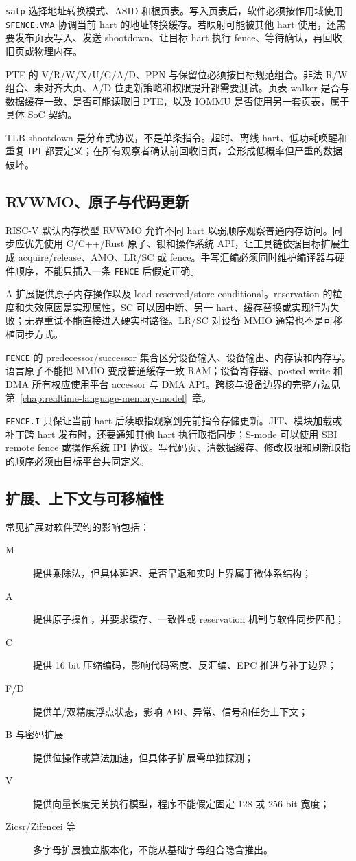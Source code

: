 \texttt{satp} 选择地址转换模式、ASID 和根页表。写入页表后，软件必须按作用域使用 \texttt{SFENCE.VMA} 协调当前 hart 的地址转换缓存。若映射可能被其他 hart 使用，还需要发布页表写入、发送 shootdown、让目标 hart 执行 fence、等待确认，再回收旧页或物理内存。

PTE 的 V/R/W/X/U/G/A/D、PPN 与保留位必须按目标规范组合。非法 R/W 组合、未对齐大页、A/D 位更新策略和权限提升都需要测试。页表 walker 是否与数据缓存一致、是否可能读取旧 PTE，以及 IOMMU 是否使用另一套页表，属于具体 SoC 契约。

TLB shootdown 是分布式协议，不是单条指令。超时、离线 hart、低功耗唤醒和重复 IPI 都要定义；在所有观察者确认前回收旧页，会形成低概率但严重的数据破坏。

\subsection{RVWMO、原子与代码更新}

RISC-V 默认内存模型 RVWMO 允许不同 hart 以弱顺序观察普通内存访问。同步应优先使用 C/C++/Rust 原子、锁和操作系统 API，让工具链依据目标扩展生成 acquire/release、AMO、LR/SC 或 fence。手写汇编必须同时维护编译器与硬件顺序，不能只插入一条 \texttt{FENCE} 后假定正确。

A 扩展提供原子内存操作以及 load-reserved/store-conditional。reservation 的粒度和失效原因是实现属性，SC 可以因中断、另一 hart、缓存替换或实现行为失败；无界重试不能直接进入硬实时路径。LR/SC 对设备 MMIO 通常也不是可移植同步方式。

\texttt{FENCE} 的 predecessor/successor 集合区分设备输入、设备输出、内存读和内存写。语言原子不能把 MMIO 变成普通缓存一致 RAM；设备寄存器、posted write 和 DMA 所有权应使用平台 accessor 与 DMA API。跨核与设备边界的完整方法见第~\ref{chap:realtime-language-memory-model}~章。

\texttt{FENCE.I} 只保证当前 hart 后续取指观察到先前指令存储更新。JIT、模块加载或补丁跨 hart 发布时，还要通知其他 hart 执行取指同步；S-mode 可以使用 SBI remote fence 或操作系统 IPI 协议。写代码页、清数据缓存、修改权限和刷新取指的顺序必须由目标平台共同定义。

\subsection{扩展、上下文与可移植性}

常见扩展对软件契约的影响包括：
\begin{description}
  \item[M] 提供乘除法，但具体延迟、是否早退和实时上界属于微体系结构；
  \item[A] 提供原子操作，并要求缓存、一致性或 reservation 机制与软件同步匹配；
  \item[C] 提供 16 bit 压缩编码，影响代码密度、反汇编、EPC 推进与补丁边界；
  \item[F/D] 提供单/双精度浮点状态，影响 ABI、异常、信号和任务上下文；
  \item[B 与密码扩展] 提供位操作或算法加速，但具体子扩展需单独探测；
  \item[V] 提供向量长度无关执行模型，程序不能假定固定 128 或 256 bit 宽度；
  \item[Zicsr/Zifencei 等] 多字母扩展独立版本化，不能从基础字母组合隐含推出。
\end{description}

